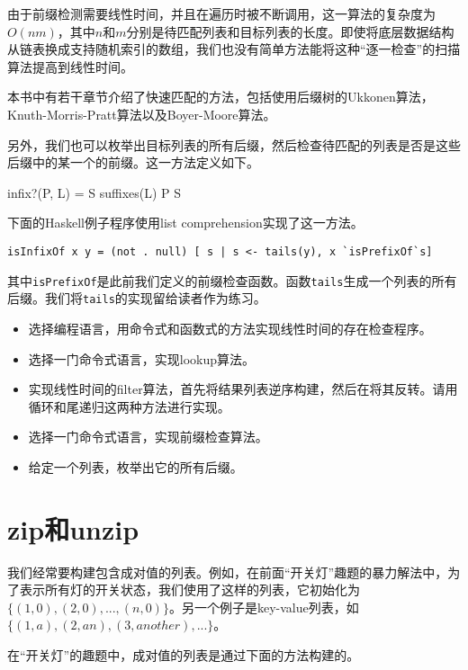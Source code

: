 \documentclass[b5paper]{ctexart}
\begin{document}
由于前缀检测需要线性时间，并且在遍历时被不断调用，这一算法的复杂度为$O(nm)$，其中$n$和$m$分别是待匹配列表和目标列表的长度。即使将底层数据结构从链表换成支持随机索引的数组，我们也没有简单方法能将这种“逐一检查”的扫描算法提高到线性时间。

本书中有若干章节介绍了快速匹配的方法，包括使用后缀树的Ukkonen算法，Knuth-Morris-Pratt算法以及Boyer-Moore算法。

另外，我们也可以枚举出目标列表的所有后缀，然后检查待匹配的列表是否是这些后缀中的某一个的前缀。这一方法定义如下。

\be
infix?(P, L) = \exists S \in suffixes(L) \land P \subseteq S
\ee

下面的Haskell例子程序使用list comprehension实现了这一方法。

\lstset{language=Haskell}
\begin{lstlisting}[style=Haskell]
isInfixOf x y = (not . null) [ s | s <- tails(y), x `isPrefixOf`s]
\end{lstlisting}

其中\texttt{isPrefixOf}是此前我们定义的前缀检查函数。函数\texttt{tails}生成一个列表的所有后缀。我们将\texttt{tails}的实现留给读者作为练习。

\begin{Exercise}
\begin{itemize}
\item 选择编程语言，用命令式和函数式的方法实现线性时间的存在检查程序。
\item 选择一门命令式语言，实现lookup算法。
\item 实现线性时间的filter算法，首先将结果列表逆序构建，然后在将其反转。请用循环和尾递归这两种方法进行实现。
\item 选择一门命令式语言，实现前缀检查算法。
\item 给定一个列表，枚举出它的所有后缀。
\end{itemize}
\end{Exercise}

\section{zip和unzip}

我们经常要构建包含成对值的列表。例如，在前面“开关灯”趣题的暴力解法中，为了表示所有灯的开关状态，我们使用了这样的列表，它初始化为$\{(1, 0), (2, 0), ..., (n, 0)\}$。另一个例子是key-value列表，如$\{(1, a), (2, an), (3, another), ... \}$。

在“开关灯”的趣题中，成对值的列表是通过下面的方法构建的。
\end{document}
